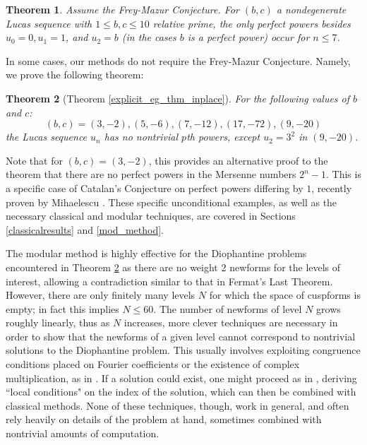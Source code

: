 \documentclass[12pt]{amsart}
\newtheorem{ithm}{Theorem}
\theoremstyle{definition}
\begin{document}
\begin{ithm}\label{cond_ex}
Assume the Frey-Mazur Conjecture.  For $(b,c)$ a nondegenerate Lucas sequence with $1 \leq b,c \leq 10$ relative prime, the only perfect powers besides $u_0=0,u_1=1$, and $u_2 = b$ (in the cases $b$ is a perfect power) occur for $n \leq 7$.
\end{ithm}


In some cases, our methods do not require the Frey-Mazur Conjecture.  Namely, we prove the following theorem:

\begin{ithm}[Theorem \ref{explicit_eg_thm_inplace}]\label{explicit_eg_thm}
For the following values of $b$ and $c$:
\begin{equation}\label{examples} (b,c) = (3,-2), (5,-6), (7,-12), (17,-72), (9,-20) \end{equation}
the Lucas sequence $u_n$ has no nontrivial $p$th powers, except $u_2 = 3^2$ in $(9,-20)$.
\end{ithm}

Note that for $(b,c) = (3,-2)$, this provides an alternative proof to the theorem that there are no perfect powers in the Mersenne numbers $2^n - 1$.  This is a specific case of Catalan's Conjecture on perfect powers differing by $1$, recently proven by Mihaelescu \cite{mih04}.  These specific unconditional examples, as well as the necessary classical and modular techniques, are covered in Sections \ref{classicalresults} and \ref{mod_method}.

The modular method is highly effective for the Diophantine problems encountered in Theorem \ref{explicit_eg_thm} as there are no weight 2 newforms for the levels of interest, allowing a contradiction similar to that in Fermat's Last Theorem.  However, there are only finitely many levels $N$ for which the space of cuspforms is empty; in fact this implies $N \leq 60$.  The number of newforms of level $N$ grows roughly linearly, thus as $N$ increases, more clever techniques are necessary in order to show that the newforms of a given level cannot correspond to nontrivial solutions to the Diophantine problem.  This usually involves exploiting congruence conditions placed on Fourier coefficients or the existence of complex multiplication, as in \cite{bennett04}.  If a solution could exist, one might proceed as in \cite{siksek06}, deriving ``local conditions" on the index of the solution, which can then be combined with classical methods.  None of these techniques, though, work in general, and often rely heavily on details of the problem at hand, sometimes combined with nontrivial amounts of computation.
\end{document}
